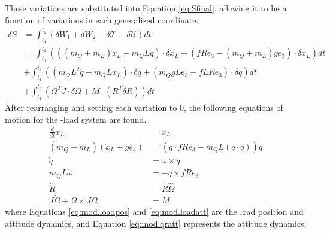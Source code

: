 
These variations are substituted into Equation \ref{eq:Sfinal}, allowing it to be a function of variations in each generalized coordinate.
\begin{equation}\label{eq:Sfinalfilled}
\begin{aligned}
\delta S &= \int_{t_1}^{t_2}(\delta W_1+\delta W_2+\delta\mathcal{T}-\delta\mathcal{U})dt\\
&=\int_{t_1}^{t_2}(((m_Q+m_L)\dot{x}_L-m_QL\dot{q})\cdot\delta\dot{x}_L+(fRe_3-(m_Q+m_L)ge_3)\cdot\delta x_L)dt\\
&+\int_{t_1}^{t_2}((m_QL^2\dot{q}-m_QL\dot{x}_L)\cdot\delta\dot{q}+(m_QgLe_3-fLRe_3)\cdot\delta q)dt\\
&+\int_{t_1}^{t_2}(\Omega^TJ \cdot \delta\Omega+M\cdot(R^T\delta R))dt
\end{aligned}
\end{equation}
After rearranging and setting each variation to 0, the following equations of motion for the -load system are found. 
\begin{align}
\frac{d}{dt} x_L &=\dot{x}_L\\
(m_Q+m_L)(\ddot{x}_L+ge_3)&=(q\cdot fRe_3-m_QL(\dot{q}\cdot\dot{q}))q\label{eq:mod.loadpos}\\
\dot{q}&=\omega\times q\\
m_QL\dot{\omega}&=-q\times fRe_3\label{eq:mod.loadatt}\\
\dot{R}&=R\hat{\Omega} \label{eq:mod.R}\\ 
J\dot{\Omega}+\Omega\times J\Omega&= M \label{eq:mod.qratt}
\end{align}
where Equations \ref{eq:mod.loadpos} and \ref{eq:mod.loadatt} are the load position and attitude dynamics, and Equation \ref{eq:mod.qratt} represents the  attitude dynamics.

